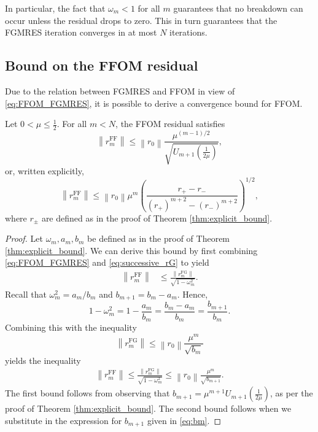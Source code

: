 \documentclass{siamart251216}
\begin{document}
{In particular, the fact that $\omega_m < 1$ for all $m$ guarantees that no breakdown can occur unless the residual drops to zero. This in turn guarantees that the FGMRES iteration converges in at most $N$ iterations.

\subsection{Bound on the FFOM residual} 
Due to the  relation between \mbox{FGMRES} and FFOM  in view of \eqref{eq:FFOM_FGMRES}, it is  possible to derive a convergence bound for FFOM.


\begin{theorem}
    Let $0 < \mu \leq \frac{1}{2}$. For all $m<N$, the FFOM residual satisfies
    \begin{equation} \label{eq:FFOM_full}
        \left\|r_m^{\mathrm{FF}}\right\| \leq \left\|r_0\right\| \frac{\mu^{(m-1)/2}}{\sqrt{U_{m+1}\left(\frac{1}{2\mu}\right)}},
    \end{equation}
    or, written explicitly,
        \begin{equation} \label{eq:FFOM_full_explicit}
        \left\|r_m^{\mathrm{FF}}\right\| \leq \left\|r_0\right\| \mu^m \left( \frac{r_+ - r_-}{\left( r_+ \right)^{m+2} - \left( r_- \right)^{m+2}} \right)^{1/2},
    \end{equation}
    where $r_{\pm}$ are defined as in the proof of Theorem \ref{thm:explicit_bound}.
\end{theorem}
\begin{proof}
    Let $\omega_m, a_m, b_m$ be defined as in the proof of Theorem \ref{thm:explicit_bound}. We can derive this bound by first combining \eqref{eq:FFOM_FGMRES} and \eqref{eq:successive_rG} to yield
    \begin{align*}
        \left\|r_m^{\mathrm{FF}}\right\| & \leq \frac{\left\|r_m^{\mathrm{FG}}\right\|}{\sqrt{1-\omega_m^2}}.
    \end{align*}
    Recall that $\omega_m^2 = a_m / b_m$ and $b_{m+1} = b_m - a_m$. Hence, $$1 - \omega_m^2 = 1 - \frac{a_m}{b_m} = \frac{b_m - a_m}{b_m} = \frac{b_{m+1}}{b_m}.$$
    Combining this with the inequality $$\left\|r_m^{\mathrm{FG}}\right\| \leq \left\|r_0\right\| \frac{\mu^m}{\sqrt{b_m}}$$
    yields the inequality
    \begin{align*}
        \left\|r_m^{\mathrm{FF}}\right\| \leq \frac{\left\|r_m^{\mathrm{FG}}\right\|}{\sqrt{1-\omega_m^2}} \leq \left\|r_0\right\| \frac{\mu^m}{\sqrt{b_{m+1}}}.
    \end{align*}
    The first bound follows from observing that $b_{m+1} = \mu^{m+1} U_{m+1}\left(\frac{1}{2\mu}\right)$, as per the proof of Theorem \ref{thm:explicit_bound}. The second bound follows when we substitute in the expression for $b_{m+1}$ given in \eqref{eq:bm}.
\end{proof}

}
\end{document}
